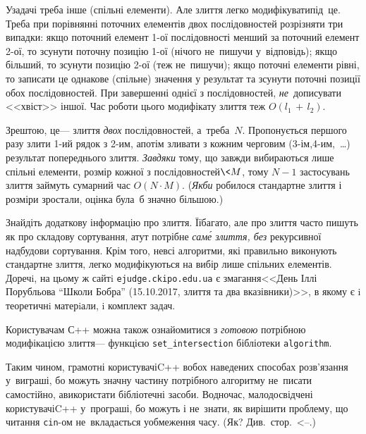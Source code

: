 У\nolinebreak[3] задачі треба інше (спільні елементи). Але злиття легко модифікувати\nolinebreak[2] під~це. Треба при порівнянні поточних елементів двох послідовностей розрізняти три випадки: якщо поточний елемент \mbox{1-ої} послідовності 
менший за поточний елемент \mbox{2-ої}, то зсунути поточну позицію \mbox{1-ої} (нічого не~пишучи у~відповідь); якщо 
більший, то зсунути позицію \mbox{2-ої} (теж не~пишучи); якщо поточні елементи рівні, то записати це однакове (спільне) значення у результат та зсунути поточні позиції обох послідовностей. При завершенні однієї з послідовностей, \emph{не}~дописувати <<хвіст>> іншої. Час роботи цього модифікату злиття теж $O({l_1\,{+}\,l_2})$.

Зрештою, це\nolinebreak[3] --- злиття \emph{двох} послідовностей, а~треба~$N$. Пропонується першого разу злити \mbox{1-ий} рядок з \mbox{2-им}, а\nolinebreak[3] потім зливати з кожним черговим (\mbox{3-ім},\nolinebreak[2] \mbox{4-им},~\dots) результат попереднього злиття. \emph{Завдяки} тому, що завжди вибираються лише спільні елементи, розмір кожної з послідовностей${}\<M$, тому ${N{-}1}$ застосувань злиття займуть сумарний час $O(N{\cdot}M)$. (\emph{Якби} робилося стандартне злиття і розміри зростали, оцінка була~б значно більшою.)

Знайдіть додаткову інформацію про злиття. Її\nolinebreak[2] багато, але про злиття часто пишуть як про складову сортування, а\nolinebreak[3] тут потрібне \emph{сам\'{е} злиття, без} рекурсивної надбудови сортування. Крім того, не\nolinebreak[3] всі алгоритми, які правильно виконують стандартне злиття, легко модифікуються на вибір лише спільних елементів.
До\nolinebreak[3] речi, на цьому ж сайтi \texttt{ejudge.ckipo.edu.ua} є змагання\nolinebreak[2] <<День Іллі Порубльова ``Школи Бобра'' (15.10.2017, злиття та два вказівники)>>, в якому є i теоретичнi матерiали, i комплект задач.

Користувачам С++ можна також ознайомитися з \emph{готовою} потрібною модифікацією злиття\nolinebreak[3] --- функцією \verb"set_intersection" бібліотеки \verb"algorithm".

Таким чином, грамотні користувачі\nolinebreak[3] C++ в\nolinebreak[3] обох наведених способах розв'язання у~виграші, бо можуть значну частину потрібного алгоритму не~писати самостійно, а\nolinebreak[3] використати бібліотечні засоби. Водночас, малодосвідчені користувачі\nolinebreak[3] C++ у~програші, бо можуть і не~знати, як вирішити проблему, що читання \verb"cin"-ом не~вкладається у\nolinebreak[3] обмеження часу. (Як? Див.~стор.~\pageref{text:io-streams-versus-scanf-printf}\ifnum{}<--\pageref{text:io-streams-versus-scanf-printf-end}\fi.)


